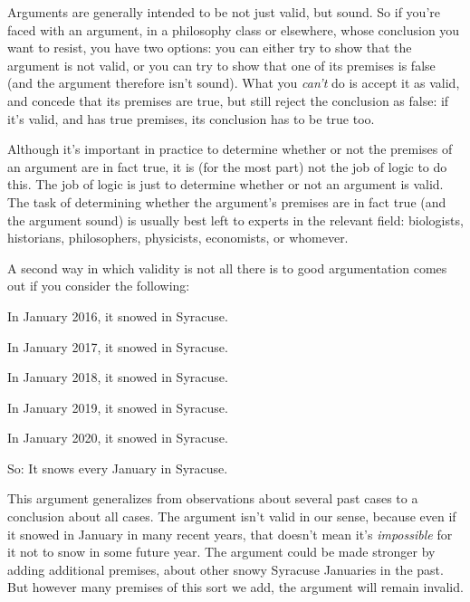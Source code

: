
Arguments are generally intended to be not just valid, but sound.  So if you're faced with an argument, in a philosophy class or elsewhere, whose conclusion you want to resist, you have two options: you can either try to show that the argument is not valid, or you can try to show that one of its premises is false (and the argument therefore isn't sound).  What you \emph{can't} do is accept it as valid, and concede that its premises are true, but still reject the conclusion as false: if it's valid, and has true premises, its conclusion has to be true too.

Although it's important in practice to determine whether or not the premises of an argument are in fact true, it is (for the most part) not the job of logic to do this.  The job of logic is just to determine whether or not an argument is valid.  The task of determining whether the argument's premises are in fact true (and the argument sound) is usually best left to experts in the relevant field: biologists,  historians, philosophers, physicists, economists, or whomever.

A second way in which validity is not all there is to good argumentation comes out if you consider the following:
	\begin{earg}
		\item[] In January 2016, it snowed in Syracuse.
		\item[] In January 2017, it snowed in Syracuse.
		\item[] In January 2018, it snowed in Syracuse.
		\item[] In January 2019, it snowed in Syracuse.
		\item[] In January 2020, it snowed in Syracuse.
	\item[So:] It snows every January in Syracuse.
\end{earg}

This argument generalizes from observations about several past cases to a conclusion about all cases. The argument isn't valid in our sense, because even if it snowed in January in many recent years, that doesn't mean it's \emph{impossible} for it not to snow in some future year.  The argument could be made stronger by adding additional premises, about other snowy Syracuse Januaries in the past. But however many premises of this sort we add, the argument will remain invalid.

